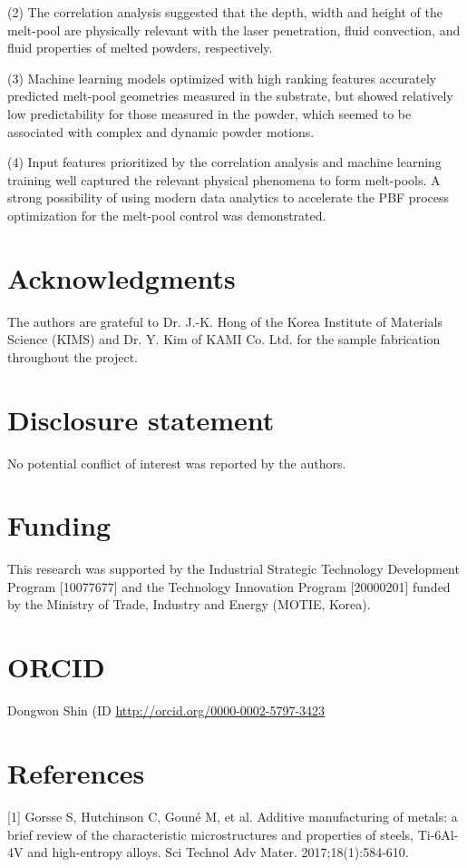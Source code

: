 \documentclass[10pt]{article}
\begin{document}
(2) The correlation analysis suggested that the depth, width and height of the melt-pool are physically relevant with the laser penetration, fluid convection, and fluid properties of melted powders, respectively.

(3) Machine learning models optimized with high ranking features accurately predicted melt-pool geometries measured in the substrate, but showed relatively low predictability for those measured in the powder, which seemed to be associated with complex and dynamic powder motions.

(4) Input features prioritized by the correlation analysis and machine learning training well captured the relevant physical phenomena to form melt-pools. A strong possibility of using modern data analytics to accelerate the PBF process optimization for the melt-pool control was demonstrated.

\section*{Acknowledgments}
The authors are grateful to Dr. J.-K. Hong of the Korea Institute of Materials Science (KIMS) and Dr. Y. Kim of KAMI Co. Ltd. for the sample fabrication throughout the project.

\section*{Disclosure statement}
No potential conflict of interest was reported by the authors.

\section*{Funding}
This research was supported by the Industrial Strategic Technology Development Program [10077677] and the Technology Innovation Program [20000201] funded by the Ministry of Trade, Industry and Energy (MOTIE, Korea).

\section*{ORCID}
Dongwon Shin (ID \href{http://orcid.org/0000-0002-5797-3423}{http://orcid.org/0000-0002-5797-3423}

\section*{References}
[1] Gorsse S, Hutchinson C, Gouné M, et al. Additive manufacturing of metals: a brief review of the characteristic microstructures and properties of steels, Ti-6Al-4V and high-entropy alloys. Sci Technol Adv Mater. 2017;18(1):584-610.
\end{document}

